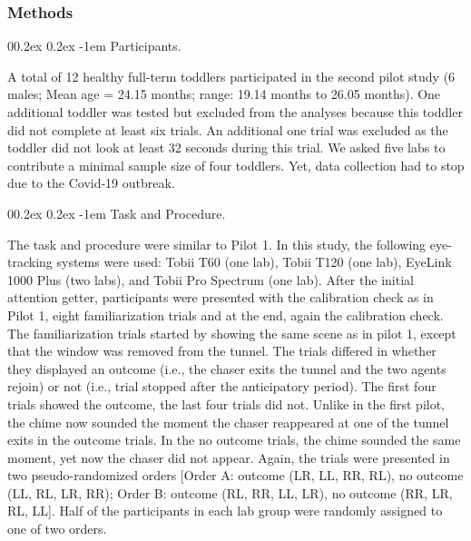 \documentclass[
  man, donotrepeattitle,floatsintext]{apa6}
\makeatletter
\let\oldparagraph\paragraph
\renewcommand{\paragraph}{
    \@ifstar
      \xxxParagraphStar
      \xxxParagraphNoStar
  }
\newcommand{\xxxParagraphStar}[1]{\oldparagraph*{#1}\mbox{}}
\newcommand{\xxxParagraphNoStar}[1]{\oldparagraph{#1}\mbox{}}
\renewcommand{\paragraph}{\@startsection{paragraph}{4}{\parindent}%
  {0\baselineskip \@plus 0.2ex \@minus 0.2ex}%
  {-1em}%
  {\normalfont\normalsize\bfseries\itshape\typesectitle}}
\makeatother
\begin{document}
\subsubsection{Methods}\label{methods-1}

\paragraph{Participants.}\label{participants.-1}

A total of 12 healthy full-term toddlers participated in the second pilot study (6 males; Mean age = 24.15 months; range: 19.14 months to 26.05 months). One additional toddler was tested but excluded from the analyses because this toddler did not complete at least six trials. An additional one trial was excluded as the toddler did not look at least 32 seconds during this trial. We asked five labs to contribute a minimal sample size of four toddlers. Yet, data collection had to stop due to the Covid-19 outbreak.

\paragraph{Task and Procedure.}\label{task-and-procedure.-1}

The task and procedure were similar to Pilot 1. In this study, the following eye-tracking systems were used: Tobii T60 (one lab), Tobii T120 (one lab), EyeLink 1000 Plus (two labs), and Tobii Pro Spectrum (one lab). After the initial attention getter, participants were presented with the calibration check as in Pilot 1, eight familiarization trials and at the end, again the calibration check. The familiarization trials started by showing the same scene as in pilot 1, except that the window was removed from the tunnel. The trials differed in whether they displayed an outcome (i.e., the chaser exits the tunnel and the two agents rejoin) or not (i.e., trial stopped after the anticipatory period). The first four trials showed the outcome, the last four trials did not. Unlike in the first pilot, the chime now sounded the moment the chaser reappeared at one of the tunnel exits in the outcome trials. In the no outcome trials, the chime sounded the same moment, yet now the chaser did not appear. Again, the trials were presented in two pseudo-randomized orders {[}Order A: outcome (LR, LL, RR, RL), no outcome (LL, RL, LR, RR); Order B: outcome (RL, RR, LL, LR), no outcome (RR, LR, RL, LL{]}. Half of the participants in each lab group were randomly assigned to one of two orders.
\end{document}
